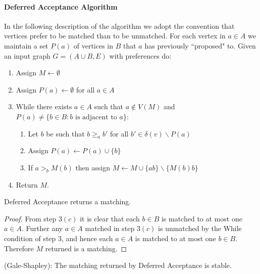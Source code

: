 \paragraph{Deferred Acceptance Algorithm}
In the following description of the algorithm we adopt the convention that vertices prefer to be matched than to be unmatched. For each vertex in $a\in A$ we maintain a set $P(a)$ of vertices in $B$ that $a$ has previously ``proposed" to. Given an input graph $G=(A \cup B, E)$ with preferences do:
\begin{enumerate}
\item Assign $M \leftarrow \emptyset$
\item Assign $P(a) \leftarrow \emptyset$ for all $a \in A$
\item While there exists $a \in A$ such that $a \not\in V(M)$ and $P(a) \neq \{b \in B : b\text{ is adjacent to } a\}$:
	\begin{enumerate}
	\item Let $b$ be such that $b \geq_a b'$ for all $b' \in \delta(v) \backslash P(a)$
	\item Assign $P(a) \leftarrow P(a) \cup \{b\}$
	\item If $a >_b M(b)$ then assign $M \leftarrow M \cup \{ab\} \backslash \{M(b)b\}$
	\end{enumerate}
\item Return $M$.
\end{enumerate}
\begin{lemma} Deferred Acceptance returns a matching.
\end{lemma}
\begin{proof}
From step $3(c)$ it is clear that each $b \in B$ is matched to at most one $a \in A$. Further any $a \in A$ matched in step $3(c)$ is unmatched by the While condition of step $3$, and hence each $a \in A$ is matched to at most one $b \in B$. Therefore $M$ returned is a matching. \end{proof}
\begin{theorem}(Gale-Shapley): The matching returned by Deferred Acceptance is stable.
\end{theorem}

